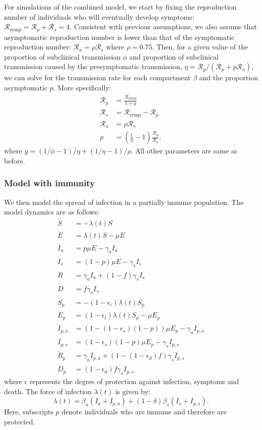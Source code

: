 \documentclass[12pt]{article}
\newcommand{\RR}{\ensuremath{{\mathcal R}}\xspace}
\begin{document}
For simulations of the combined model, we start by fixing the reproduction number of individuals who will eventually develop symptoms: $\RR_{\textrm{symp}} = \RR_p + \RR_s = 4$. 
Consistent with previous assumptions, we also assume that asymptomatic reproduction number is lower than that of the symptomatic reproduction number: $\RR_a = \rho \RR_s$ where $\rho = 0.75$.
Then, for a given value of the proportion of subclinical transmission $\phi$ and proportion of subclinical transmission caused by the presymptomatic transmission, $\eta = \RR_p/(\RR_p + p \RR_a)$, we can solve for the transmission rate for each compartment $\beta$ and the proportion asymptomatic $p$.
More specifically:
\begin{align}
\RR_p &= \frac{\RR_{\textrm{symp}}}{1 + y}\\
\RR_s &= \RR_{\textrm{symp}} - \RR_p\\
\RR_a &=  \rho \RR_s\\
p &= \left(\frac{1}{\eta} - 1 \right) \frac{\RR_p}{\RR_a},
\end{align}
where $y = (1/\phi - 1)/\eta + (1/\eta - 1)/\rho$.
All other parameters are same as before.

\subsubsection*{Model with immunity}

We then model the spread of infection in a partially immune population.
The model dynamics are as follows:
\begin{align}
\dot{S} &= -\lambda (t) S \\
\dot{E} &= \lambda (t) S - \mu E\\
\dot{I}_a &= p \mu E - \gamma_a I_a\\
\dot{I}_s &= (1-p) \mu E -\gamma_s I_s\\
\dot{R} &= \gamma_a I_a + (1-f) \gamma_s I_s \\
\dot{D} &= f \gamma_s I_s\\
\dot{S}_p &= - (1-\epsilon_i) \lambda (t) S_p \\
\dot{E}_p &= (1-\epsilon_i) \lambda (t) S_p - \mu E_p\\
\dot{I}_{p, a} &= (1 - (1-\epsilon_s) (1-p)) \mu E_p - \gamma_a I_{p,a}\\
\dot{I}_{p, s} &= (1-\epsilon_s) (1-p) \mu E_p -\gamma_s I_{p,s}\\
\dot{R}_p &= \gamma_a I_{p,a} + (1-(1-\epsilon_d) f) \gamma_s I_{p,s} \\
\dot{D}_p &= (1-\epsilon_d) f \gamma_s I_{p,s}
\end{align}
where $\epsilon$ represents the degree of protection against infection, symptoms and death. 
The force of infection $\lambda(t)$ is given by:
\begin{equation}
\lambda(t) = \beta_a (I_a + I_{p,a}) + (1-\delta) \beta_s (I_s + I_{p,s}).
\end{equation}
Here, subscripts $p$ denote individuals who are immune and therefore are protected.
\end{document}
